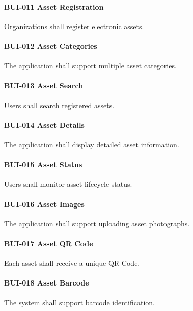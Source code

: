 \paragraph{BUI-011 Asset Registration}

Organizations shall register electronic assets.

\paragraph{BUI-012 Asset Categories}

The application shall support multiple asset categories.

\paragraph{BUI-013 Asset Search}

Users shall search registered assets.

\paragraph{BUI-014 Asset Details}

The application shall display detailed asset information.

\paragraph{BUI-015 Asset Status}

Users shall monitor asset lifecycle status.

\paragraph{BUI-016 Asset Images}

The application shall support uploading asset photographs.

\paragraph{BUI-017 Asset QR Code}

Each asset shall receive a unique QR Code.

\paragraph{BUI-018 Asset Barcode}

The system shall support barcode identification.

